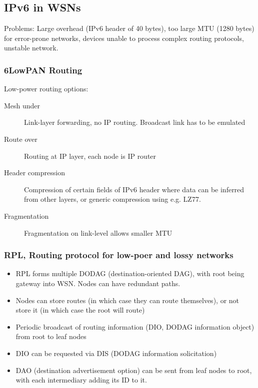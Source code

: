 \subsection{IPv6 in WSNs}

Problems: Large overhead (IPv6 header of 40 bytes), too large MTU (1280 bytes)
for error-prone networks, devices unable to process complex routing protocols,
unstable network.

\subsubsection{6LowPAN Routing}

Low-power routing options:
\begin{description}
		\item[Mesh under] Link-layer forwarding, no IP routing. Broadcast link has to be emulated
		\item[Route over] Routing at IP layer, each node is IP router
		\item[Header compression] Compression of certain fields of IPv6 header where data can be inferred from other layers, or generic compression using e.g. LZ77.
		\item[Fragmentation] Fragmentation on link-level allows smaller MTU
\end{description}

\subsubsection{RPL, Routing protocol for low-poer and lossy networks}

\begin{itemize}
		\item RPL forms multiple DODAG (destination-oriented DAG), with root
				being gateway into WSN. Nodes can have redundant paths.
		\item Nodes can store routes (in which case they can route themselves),
				or not store it (in which case the root will route)
		\item Periodic broadcast of routing information (DIO, DODAG information
				object) from root to leaf nodes
		\item DIO can be requested via DIS (DODAG information solicitation)
		\item DAO (destination advertisement option) can be sent from leaf
				nodes to root, with each intermediary adding its ID to it.
\end{itemize}

